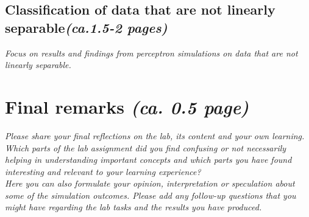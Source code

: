 \documentclass[a4paper]{article}
\begin{document}
\subsection{Classification of data that are not linearly separable\textit{(ca.1.5-2 pages)}}
\textit{Focus on results and findings from perceptron simulations on data that are not linearly separable.}


\section{Final remarks \normalsize{\textit{(ca. 0.5 page)}}}
\textit{Please share your final reflections on the lab, its content and your own learning. Which parts of the lab assignment did you find confusing or not necessarily helping in understanding important concepts and which parts you have found interesting and relevant to your learning experience? \\
Here you can also formulate your opinion, interpretation or speculation about some of the simulation outcomes. Please add any follow-up questions that you might have regarding the lab tasks and the results you have produced.}
\end{document}
